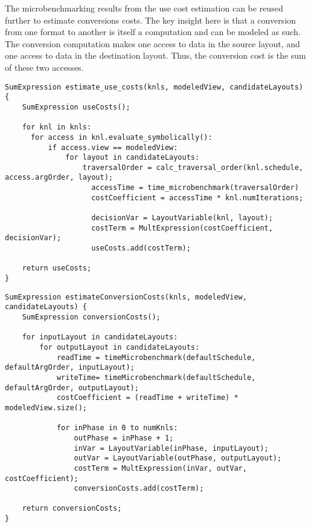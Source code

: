 The microbenchmarking results from the use cost estimation can be reused further to estimate conversions costs.
The key insight here is that a conversion from one format to another is itself a computation and can be modeled as such.
The conversion computation makes one access to data in the source layout, and one access to data in the destination layout. 
Thus, the conversion cost is the sum of these two accesses.


\begin{lstlisting}[caption={Algorithm for generating the objective function's use cost terms.}]
SumExpression estimate_use_costs(knls, modeledView, candidateLayouts) {
	SumExpression useCosts();

	for knl in knls:
	  for access in knl.evaluate_symbolically():
		  if access.view == modeledView:
			  for layout in candidateLayouts:
				  traversalOrder = calc_traversal_order(knl.schedule, access.argOrder, layout);
					accessTime = time_microbenchmark(traversalOrder)
					costCoefficient = accessTime * knl.numIterations;

					decisionVar = LayoutVariable(knl, layout);
					costTerm = MultExpression(costCoefficient, decisionVar);
					useCosts.add(costTerm);
	
	return useCosts;
}
\end{lstlisting}

\begin{lstlisting}[caption={Algorithm for generating the objective function's conversion cost terms.}]
SumExpression estimateConversionCosts(knls, modeledView, candidateLayouts) {
	SumExpression conversionCosts();

	for inputLayout in candidateLayouts:
		for outputLayout in candidateLayouts:
			readTime = timeMicrobenchmark(defaultSchedule, defaultArgOrder, inputLayout);
			writeTime= timeMicrobenchmark(defaultSchedule, defaultArgOrder, outputLayout);
			costCoefficient = (readTime + writeTime) * modeledView.size();

			for inPhase in 0 to numKnls:
				outPhase = inPhase + 1;
				inVar = LayoutVariable(inPhase, inputLayout);
				outVar = LayoutVariable(outPhase, outputLayout);
				costTerm = MultExpression(inVar, outVar, costCoefficient);
				conversionCosts.add(costTerm);
	
	return conversionCosts;
}
\end{lstlisting}

